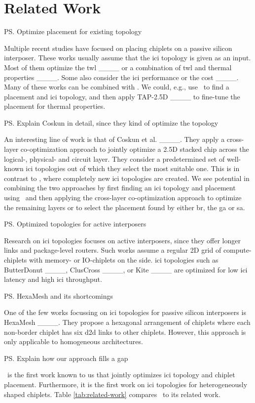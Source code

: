 \section{Related Work}
\label{sec:related-work}

\ps{Optimize placement for existing topology}

Multiple recent studies have focused on placing chiplets on a passive silicon interposer.
These works usually assume that the \gls{ici} topology is given as an input.
Most of them optimize the \gls{twl} ____ or a combination of \gls{twl} and thermal properties ____.
Some also consider the \gls{ici} performance or the cost ____.
Many of these works can be combined with \name. 
We could, e.g., use \name~to find a placement and \gls{ici} topology, and then apply TAP-2.5D ____ to fine-tune the placement for thermal properties. 

\ps{Explain Coskun in detail, since they kind of optimize the topology}

An interesting line of work is that of Coskun et al. ____.
They apply a cross-layer co-optimization approach to jointly optimize a 2.5D stacked chip across the logical-, physical- and circuit layer.
They consider a predetermined set of well-known \gls{ici} topologies out of which they select the most suitable one.
This is in contrast to \name, where completely new \gls{ici} topologies are created.
We see potential in combining the two approaches by first finding an \gls{ici} topology and placement using \name~and then applying the cross-layer co-optimization approach to optimize the remaining layers or to select the placement found by either \gls{br}, the \gls{ga} or \gls{sa}.

\ps{Optimized topologies for active interposers}

Research on \gls{ici} topologies focuses on active interposers, since they offer longer links and package-level routers.
Such works assume a regular 2D grid of compute-chiplets with memory- or IO-chiplets on the side.
\gls{ici} topologies such as ButterDonut ____, ClusCross ____, or Kite ____ are optimized for low \gls{ici} latency and high \gls{ici} throughput.

\ps{HexaMesh and its shortcomings}

One of the few works focussing on \gls{ici} topologies for passive silicon interposers is HexaMesh ____.
They propose a hexagonal arrangement of chiplets where each non-border chiplet has six \gls{d2d} links to other chiplets.
However, this approach is only applicable to homogeneous architectures.

\ps{Explain how our approach fills a gap}

\name~is the first work known to us that jointly optimizes \gls{ici} topology and chiplet placement.
Furthermore, it is the first work on \gls{ici} topologies for heterogeneously shaped chiplets.
Table \ref{tab:related-work} compares \name~to its related work.